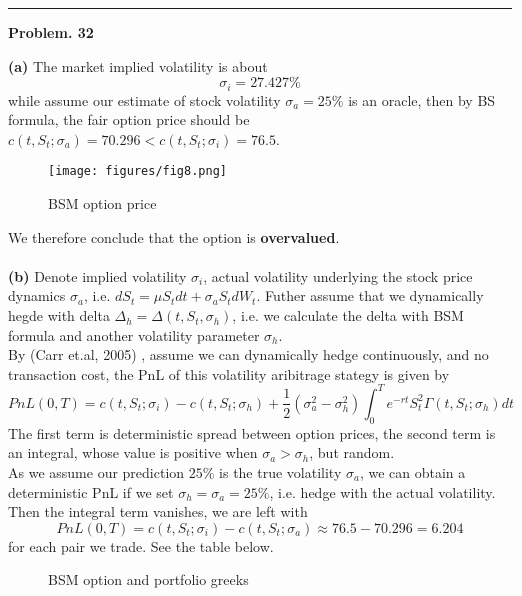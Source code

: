 \documentclass[10 pt]{hwtemplate} %
\begin{document}
\noindent\rule{16cm}{0.4pt}
\textbf{Problem. 32} 
\begin{solution} \textbf{(a)} The market implied volatility is about 
$$
\sigma_i = 27.427\%
$$
while assume our estimate of stock volatility $\sigma_a = 25\%$ is an oracle, then by BS formula, the fair option price should be $c(t,S_t;\sigma_a) = 70.296 < c(t,S_t;\sigma_i) = 76.5$. 
\begin{figure}[H]
  \centering
  \captionsetup{justification=centering}
  \caption{BSM option price}
  \texttt{[image: figures/fig8.png]}
\end{figure}
We therefore conclude that the option is \textbf{overvalued}.\\
~\\
\textbf{(b)} Denote implied volatility $\sigma_i$, actual volatility underlying the stock price dynamics $\sigma_a$, i.e. $dS_t = \mu S_t dt + \sigma_a S_t dW_t$. Futher assume that we dynamically hegde with delta $\Delta_h = \Delta(t,S_t,\sigma_h)$, i.e. we calculate the delta with BSM formula and another volatility parameter $\sigma_h$. \\
By (Carr et.al, 2005) \cite{ccp}, assume we can dynamically hedge continuously, and no transaction cost, the PnL of this volatility aribitrage stategy is given by
\begin{equation}
  PnL(0, T) = c(t,S_t; \sigma_i)-c(t,S_t; \sigma_h) + \frac{1}{2}(\sigma^2_a - \sigma_h^2)\int_0^T e^{-rt}S^2_t \Gamma(t,S_t;\sigma_h) dt
\end{equation}
The first term is deterministic spread between option prices, the second term is an integral, whose value is positive when $\sigma_a>\sigma_h$, but random. \\
As we assume our prediction $25\%$ is the true volatility $\sigma_a$, we can obtain a deterministic PnL if we set $\sigma_h = \sigma_a = 25\%$, i.e. hedge with the actual volatility. Then the integral term vanishes, we are left with
\begin{equation}
   PnL(0, T)  = c(t,S_t; \sigma_i)-c(t,S_t; \sigma_a) \approx 76.5 - 70.296 = 6.204
 \end{equation} 
 for each pair we trade. See the table below.
\begin{figure}[H]
  \centering
  \captionsetup{justification=centering}
  \caption{BSM option and portfolio greeks}

\end{figure}
\end{solution}
\end{document}
